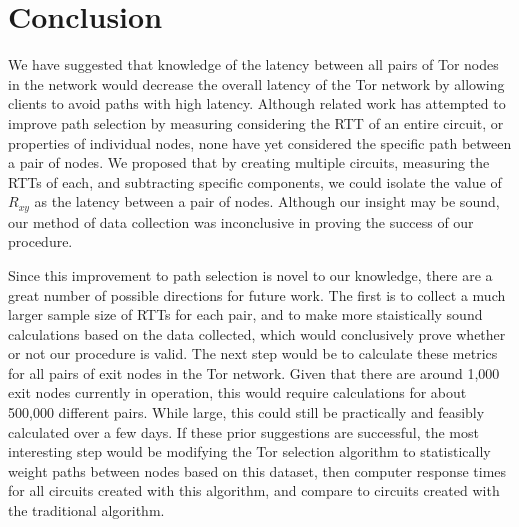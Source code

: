 \documentclass[twocolumn,11pt]{article}
\begin{document}
\section{Conclusion}
We have suggested that knowledge of the latency between all pairs of Tor nodes in the network would decrease the overall latency of the Tor network by allowing clients to avoid paths with high latency. Although related work has attempted to improve path selection by measuring considering the RTT of an entire circuit, or properties of individual nodes, none have yet considered the specific path between a pair of nodes. We proposed that by creating multiple circuits, measuring the RTTs of each, and subtracting specific components, we could isolate the value of $R_{xy}$ as the latency between a pair of nodes. Although our insight may be sound, our method of data collection was inconclusive in proving the success of our procedure. 

Since this improvement to path selection is novel to our knowledge, there are a great number of possible directions for future work. The first is to collect a much larger sample size of RTTs for each pair, and to make more staistically sound calculations based on the data collected, which would conclusively prove whether or not our procedure is valid. The next step would be to calculate these metrics for all pairs of exit nodes in the Tor network. Given that there are around 1,000 exit nodes currently in operation, this would require calculations for about 500,000 different pairs. While large, this could still be practically and feasibly calculated over a few days. If these prior suggestions are successful, the most interesting step would be modifying the Tor selection algorithm to statistically weight paths between nodes based on this dataset, then computer response times for all circuits created with this algorithm, and compare to circuits created with the traditional algorithm.



\end{document}
